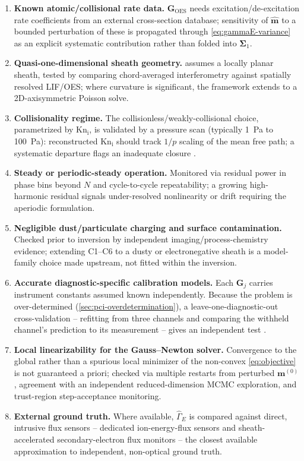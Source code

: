 \begin{enumerate}
\item \textbf{Known atomic/collisional rate data.} $\mathbf G_{\mathrm{OES}}$ needs excitation/de-excitation rate coefficients from an external cross-section database; sensitivity of $\hat{\mathbf m}$ to a bounded perturbation of these is propagated through \cref{eq:gammaE-variance} as an explicit systematic contribution rather than folded into $\boldsymbol\Sigma_{1}$.
\item \textbf{Quasi-one-dimensional sheath geometry.}  assumes a locally planar sheath, tested by comparing chord-averaged interferometry against spatially resolved LIF/OES; where curvature is significant, the framework extends to a 2D-axisymmetric Poisson solve.
\item \textbf{Collisionality regime.} The collisionless/weakly-collisional choice, parametrized by $\mathrm{Kn}_{\mathrm i}$, is validated by a pressure scan (typically \SI{1}{\pascal} to \SI{100}{\pascal}): reconstructed $\mathrm{Kn}_{\mathrm i}$ should track $1/p$ scaling of the mean free path; a systematic departure flags an inadequate closure \cite{ref0077}.
\item \textbf{Steady or periodic-steady operation.} Monitored via residual power in phase bins beyond $N$ and cycle-to-cycle repeatability; a growing high-harmonic residual signals under-resolved nonlinearity or drift requiring the aperiodic formulation.
\item \textbf{Negligible dust/particulate charging and surface contamination.} Checked prior to inversion by independent imaging/process-chemistry evidence; extending C1--C6 to a dusty or electronegative sheath is a model-family choice made upstream, not fitted within the inversion.
\item \textbf{Accurate diagnostic-specific calibration models.} Each $\mathbf G_{j}$ carries instrument constants assumed known independently. Because the problem is over-determined (\cref{sec:pci-overdetermination}), a leave-one-diagnostic-out cross-validation -- refitting from three channels and comparing the withheld channel's prediction to its measurement -- gives an independent test \cite{ref0719}.
\item \textbf{Local linearizability for the Gauss--Newton solver.} Convergence to the global rather than a spurious local minimizer of the non-convex \cref{eq:objective} is not guaranteed a priori; checked via multiple restarts from perturbed $\mathbf m^{(0)}$, agreement with an independent reduced-dimension MCMC exploration, and trust-region step-acceptance monitoring.
\item \textbf{External ground truth.} Where available, $\hat\Gamma_{E}$ is compared against direct, intrusive flux sensors -- dedicated ion-energy-flux sensors \cite{ref0075} and sheath-accelerated secondary-electron flux monitors \cite{ref0078} -- the closest available approximation to independent, non-optical ground truth.
\end{enumerate}

